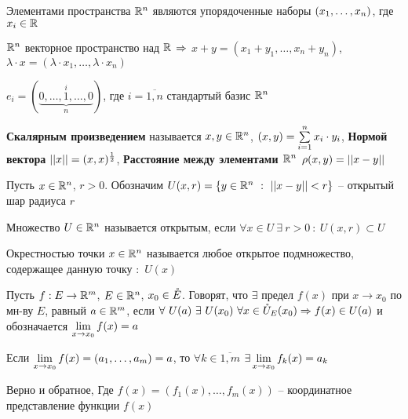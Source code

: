 \begin{DEF}
	Элементами пространства $\mathbb{R}^n$ являются упорядоченные наборы $\left(x_1,\ldots,x_n\right)$, где $x_i \in \mathbb{R}$
\end{DEF}

\begin{DEF}
	$\mathbb{R}^n$ векторное пространство над $\mathbb{R}$ $\Rightarrow$ $x + y = (x_1+y_1, \ldots, x_{n}+y_{n})$, $\lambda \cdot x = (\lambda \cdot x_1, \ldots, \lambda \cdot x_n)$
\end{DEF}

\begin{DEF}
	$e_i = (\underbrace{0, \ldots, 1,\ldots,0}_n^i)$, где $i = \overline{1,n}$ стандартый базис $\mathbb{R}^n$
\end{DEF}

\begin{DEF}
	\textbf{Скалярным произведением} называется $x,y \in \mathbb{R}^n$, $\left( x,y\right) = \sum\limits_{i=1}^{n}x_i \cdot y_i$, \textbf{Нормой вектора} $\left|\left| x\right|\right| = (x,x)^{\frac{1}{2}}$, \textbf{Расстояние между элементами $\mathbb{R}^n$} $\rho(x,y)= \left|\left| x-y\right|\right|$
\end{DEF}

\begin{DEF}
	Пусть $x \in \mathbb{R}^n$, $r > 0$. Обозначим $U(x,r) = \fskobk{y \in \Rmern{n} \ : \ \DModul{x-y} < r}$ -- открытый шар радиуса $r$
\end{DEF}

\begin{DEF}
	Множество $U \in \mathbb{R}^n$ называется открытым, если $\forall x \in U \ \exists \ r > 0 \ : \  U(x,r) \subset U$
\end{DEF}

\begin{DEF}
	Окрестностью точки $x \in \mathbb{R}^n$ называется любое открытое подмножество, содержащее данную точку $:$ $U(x)$
\end{DEF}

\begin{DEF}
	Пусть $f: E \to \mathbb{R}^m$, $E \in \mathbb{R}^n$, $x_0 \in \mathring{E}$. Говорят, что $\exists$ предел $f(x)$ при $x\to x_0$ по мн-ву $E$, равный $a \in \mathbb{R}^m$, если $\forall \ U(a) \ \exists \ U(x_0) \ \forall x \in \mathring{U}_{E}(x_0) \Rightarrow f(x) \in U(a)$
	и обозначается $\lim\limits_{x \to x_0}f(x)= a$
\end{DEF}

\begin{claim}[]
	Если $\lim\limits_{x\to x_0}f(x)=(a_1,\ldots,a_m)=a$, то $\forall k \in \overline{1,m} $ $\exists \lim\limits_{x \to x_0}f_k(x)=a_k$

	Верно и обратное, Где $f(x)=(f_1(x),\ldots,f_m(x))$ -- координатное представление функции $f(x)$

\end{claim}

